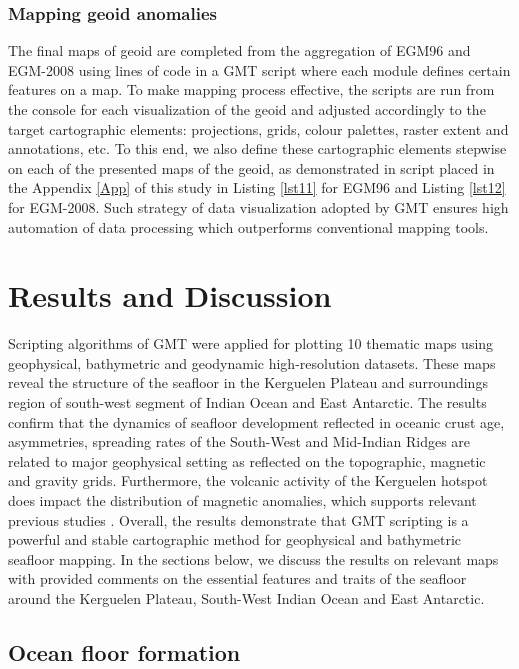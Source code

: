 \documentclass[geomatics,article,submit,pdftex,moreauthors]{Definitions/mdpi}
\begin{document}
\subsubsection{Mapping geoid anomalies}

The final maps of geoid are completed from the aggregation of EGM96 and EGM-2008 using lines of code in a GMT script where each module defines certain features on a map. To make mapping process effective, the scripts are run from the console for each visualization of the geoid and adjusted accordingly to the target cartographic elements: projections, grids, colour palettes, raster extent and annotations, etc. To this end, we also define these cartographic elements stepwise on each of the presented maps of the geoid, as demonstrated in script placed in the Appendix \ref{App} of this study in Listing \ref{lst11} for EGM96 and Listing \ref{lst12} for EGM-2008. Such strategy of data visualization adopted by GMT ensures high automation of data processing which outperforms conventional mapping tools.

\section{Results and Discussion}

Scripting algorithms of GMT were applied for plotting 10 thematic maps using geophysical, bathymetric and geodynamic high-resolution datasets. These maps reveal the structure of the seafloor in the Kerguelen Plateau and surroundings region of south-west segment of Indian Ocean and East Antarctic. The results confirm that the dynamics of seafloor development reflected in oceanic crust age, asymmetries, spreading rates of the South-West and Mid-Indian Ridges are related to major geophysical setting as reflected on the topographic, magnetic and gravity grids. Furthermore, the volcanic activity of the Kerguelen hotspot does impact the distribution of magnetic anomalies, which supports relevant previous studies \cite{Fanjat,Weissel,Jokat}. Overall, the results demonstrate that GMT scripting is a powerful and stable cartographic method for geophysical and bathymetric seafloor mapping. In the sections below, we discuss the results on relevant maps with provided comments on the essential features and traits of the seafloor around the Kerguelen Plateau, South-West Indian Ocean and East Antarctic.

\subsection{Ocean floor formation}
\end{document}
